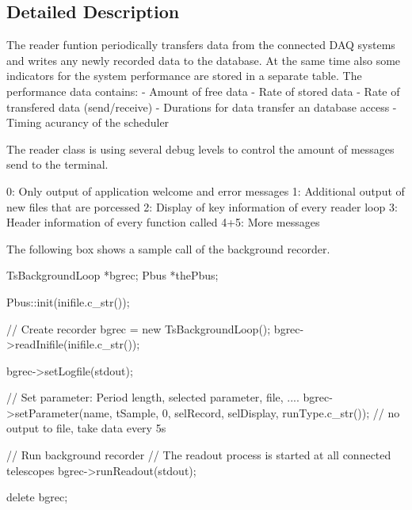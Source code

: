 \subsection{Detailed Description}
\begin{DoxyVerb}The reader funtion periodically transfers data from the 
connected DAQ systems and writes any newly recorded data 
to the database. At the same time also some indicators 
for the system performance are stored in a separate 
table. The performance data contains:
 - Amount of free data
 - Rate of stored data
 - Rate of transfered data (send/receive)
 - Durations for data transfer an database access
 - Timing acurancy of the scheduler

The reader class is using several debug levels to control the
amount of messages send to the terminal. 

0: Only output of application welcome and error messages
1: Additional output of new files that are porcessed
2: Display of key information of every reader loop
3: Header information of every function called
4+5: More messages


The following box shows a sample call of the background recorder.
\end{DoxyVerb}
 \begin{DoxyVerb}  TsBackgroundLoop *bgrec;
  Pbus *thePbus;

  Pbus::init(inifile.c_str());


  // Create recorder
  bgrec = new TsBackgroundLoop();
  bgrec->readInifile(inifile.c_str());

  bgrec->setLogfile(stdout);

  // Set parameter: Period length, selected parameter, file, ....
  bgrec->setParameter(name, tSample, 0, selRecord, selDisplay, runType.c_str());  // no output to file, take data every 5s

  // Run background recorder
  // The readout process is started at all connected telescopes
  bgrec->runReadout(stdout);

  delete bgrec;
\end{DoxyVerb}
 


